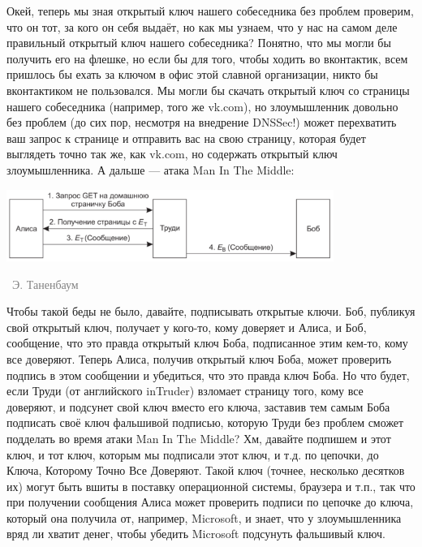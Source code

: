\documentclass[a5paper]{article}
\newcommand{\attribution}[1] {
\vspace{-5mm}\begin{flushright}\begin{scriptsize}\textcolor{gray}{\textcopyright\, #1}\end{scriptsize}\end{flushright}
}
\begin{document}
Окей, теперь мы зная открытый ключ нашего собеседника без проблем проверим, что он тот, за кого он себя выдаёт, но как мы узнаем, что у нас на самом деле правильный открытый ключ нашего собеседника? Понятно, что мы могли бы получить его на флешке, но если бы для того, чтобы ходить во вконтактик, всем пришлось бы ехать за ключом в офис этой славной организации, никто бы вконтактиком не пользовался. Мы могли бы скачать открытый ключ со страницы нашего собеседника (например, того же vk.com), но злоумышленник довольно без проблем (до сих пор, несмотря на внедрение DNSSec!) может перехватить ваш запрос к странице и отправить вас на свою страницу, которая будет выглядеть точно так же, как vk.com, но содержать открытый ключ злоумышленника. А дальше --- атака Man In The Middle:

\begin{center}
    \includegraphics[width=0.8\textwidth]{manInTheMiddle.png}
    \attribution{Э. Таненбаум}
\end{center}

Чтобы такой беды не было, давайте, подписывать открытые ключи. Боб, публикуя свой открытый ключ, получает у кого-то, кому доверяет и Алиса, и Боб, сообщение, что это правда открытый ключ Боба, подписанное этим кем-то, кому все доверяют. Теперь Алиса, получив открытый ключ Боба, может проверить подпись в этом сообщении и убедиться, что это правда ключ Боба. Но что будет, если Труди (от английского inTruder) взломает страницу того, кому все доверяют, и подсунет свой ключ вместо его ключа, заставив тем самым Боба подписать своё ключ фальшивой подписью, которую Труди без проблем сможет подделать во время атаки Man In The Middle? Хм, давайте подпишем и этот ключ, и тот ключ, которым мы подписали этот ключ, и т.д. по цепочки, до Ключа, Которому Точно Все Доверяют. Такой ключ (точнее, несколько десятков их) могут быть вшиты в поставку операционной системы, браузера и т.п., так что при получении сообщения Алиса может проверить подписи по цепочке до ключа, который она получила от, например, Microsoft, и знает, что у злоумышленника вряд ли хватит денег, чтобы убедить Microsoft подсунуть фальшивый ключ.
\end{document}
